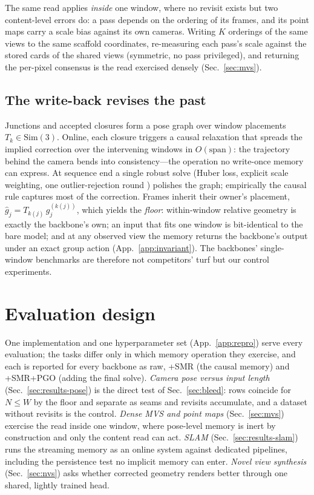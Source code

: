 \documentclass{article}
\newcommand{\smr}{\textsc{SMR}}
\newcommand{\simthree}{\mathrm{Sim}(3)}
\begin{document}
The same read applies \emph{inside} one window, where no revisit exists
but two content-level errors do: a pass depends on the ordering of its
frames, and its point maps carry a scale bias against its own cameras.
Writing $K$ orderings of the same views to the same scaffold coordinates,
re-measuring each pass's scale against the stored cards of the shared views
(symmetric, no pass privileged), and returning the per-pixel consensus is
the read exercised densely (Sec.~\ref{sec:mvs}).

\subsection{The write-back revises the past}
\label{sec:correct}
Junctions and accepted closures form a pose graph over window placements
$T_k\in\simthree$. Online, each closure triggers a causal relaxation that
spreads the implied correction over the intervening windows in
$O(\text{span})$: the trajectory behind the camera bends into
consistency---the operation no write-once memory can express. At sequence
end a single robust solve (Huber loss, explicit scale weighting, one
outlier-rejection round \citep{huber,grisetti}) polishes the graph;
empirically the causal rule captures most of the correction. Frames inherit
their owner's placement, $\hat g_j=T_{k(j)}\,g_j^{(k(j))}$, which yields the
\emph{floor}: within-window relative geometry is exactly the backbone's own;
an input that fits one window is bit-identical to the bare model; and at any
observed view the memory returns the backbone's output under an exact group
action (App.~\ref{app:invariant}). The backbones' single-window benchmarks
are therefore not competitors' turf but our control experiments.

\section{Evaluation design}
\label{sec:tasks}
One implementation and one hyperparameter set (App.~\ref{app:repro}) serve
every evaluation; the tasks differ only in which memory operation they
exercise, and each is reported for every backbone as raw, +\smr{} (the causal
memory) and +\smr{}+PGO (adding the final solve). \emph{Camera pose versus
input length} (Sec.~\ref{sec:results-pose}) is the direct test of
Sec.~\ref{sec:bleed}: rows coincide for $N\le W$ by the floor and separate
as seams and revisits accumulate, and a dataset without revisits is the
control. \emph{Dense MVS and point maps} (Sec.~\ref{sec:mvs}) exercise the
read inside one window, where pose-level memory is inert by construction and
only the content read can act. \emph{SLAM} (Sec.~\ref{sec:results-slam})
runs the streaming memory as an online system against dedicated pipelines,
including the persistence test no implicit memory can enter. \emph{Novel view
synthesis} (Sec.~\ref{sec:nvs}) asks whether corrected geometry renders
better through one shared, lightly trained head.
\end{document}
